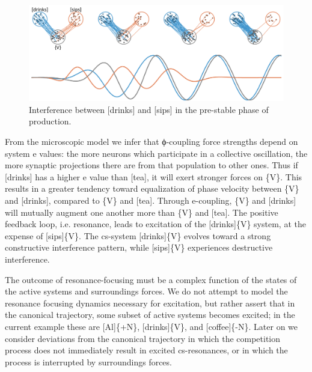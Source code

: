   
\begin{figure}
\includegraphics[width=\textwidth]{figures/Tilsen-img52.png}
\caption{Interference between [drinks] and [sips] in the pre-stable phase of production.}
\label{fig:4:2}
\end{figure}
 

  From the microscopic model we infer that ϕ{}-coupling force strengths depend on system e values: the more neurons which participate in a collective oscillation, the more synaptic projections there are from that population to other ones. Thus if [drinks] has a higher e value than [tea], it will exert stronger forces on \{V\}. This results in a greater tendency toward equalization of phase velocity between \{V\} and [drinks], compared to \{V\} and [tea]. Through e-coupling, \{V\} and [drinks] will mutually augment one another more than \{V\} and [tea]. The positive feedback loop, i.e. resonance, leads to excitation of the [drinks]\{V\} system, at the expense of [sips]\{V\}. The cs-system [drinks]\{V\} evolves toward a strong constructive interference pattern, while [sips]\{V\} experiences destructive interference.

  The outcome of resonance-focusing must be a complex function of the states of the active systems and surroundings forces. We do not attempt to model the resonance focusing dynamics necessary for excitation, but rather assert that in the canonical trajectory, some subset of active systems becomes excited; in the current example these are [Al]\{+N\}, [drinks]\{V\}, and [coffee]\{-N\}. Later on we consider deviations from the canonical trajectory in which the competition process does not immediately result in excited cs-resonances, or in which the process is interrupted by surroundings forces.

